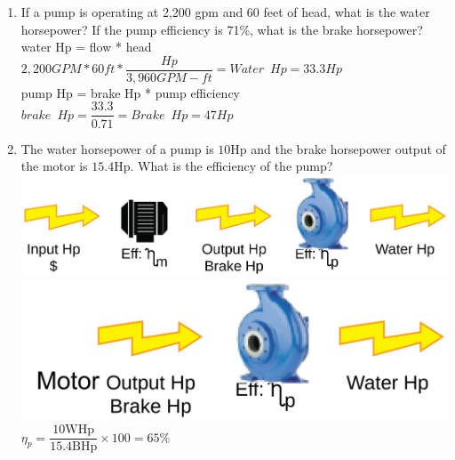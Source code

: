 \documentclass{article}
\begin{document}
\begin{enumerate}
 
 
 
   \item If a pump is operating at 2,200 gpm and 60 feet of head, what is the water
horsepower? If the pump efficiency is 71\%, what is the brake horsepower?\\
\vspace{0.4cm}
water Hp = flow * head\\
$2,200GPM*60ft*\dfrac{Hp}{3,960 GPM-ft}=\boxed{Water \enspace Hp = 33.3Hp}$\\
\vspace{0.4cm}
pump Hp = brake Hp * pump efficiency\\
$brake \enspace Hp = \dfrac{33.3}{0.71}=\boxed{Brake \enspace Hp=47Hp}$
 \vspace{0.2cm}

\item The water horsepower of a pump is $10 \mathrm{Hp}$ and the brake horsepower output of the motor is $15.4 \mathrm{Hp}$. What is the efficiency of the pump?\\
 \vspace{0.2cm}
 \vspace{0.4cm}\includegraphics[scale=0.08]{PumpProblem}\\
 \vspace{0.2cm}
 \includegraphics[scale=0.32]{PumpingProblemPump}
 $\eta_p=\dfrac{10 \mathrm{WHp}}{15.4 \mathrm{BHp}} \times 100=\boxed{65 \%}$
 \vspace{0.2cm}


\end{enumerate}
\end{document}
